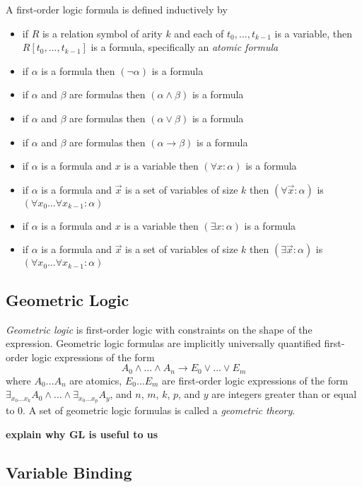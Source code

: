 		A first-order logic formula is defined inductively by
		\begin{itemize}
		\item if $R$ is a relation symbol of arity $k$ and each of $t_0 , \ldots , t_{k-1}$ is a variable, then $R[t_0,\ldots,t_{k-1}]$ is a formula, specifically an \emph{atomic formula}
		\item if $\alpha$ is a formula then $(\neg\alpha)$ is a formula
		\item if $\alpha$ and $\beta$ are formulas then $(\alpha\wedge\beta)$ is a formula
		\item if $\alpha$ and $\beta$ are formulas then $(\alpha\vee\beta)$ is a formula
		\item if $\alpha$ and $\beta$ are formulas then $(\alpha\to\beta)$ is a formula
		\item if $\alpha$ is a formula and $x$ is a variable then $(\forall x : \alpha)$ is a formula
		\item if $\alpha$ is a formula and $\vec{x}$ is a set of variables of size $k$ then $(\forall \vec{x} : \alpha)$ is $(\forall x_0 \ldots \forall x_{k-1} : \alpha)$
		\item if $\alpha$ is a formula and $x$ is a variable then $(\exists x : \alpha)$ is a formula
		\item if $\alpha$ is a formula and $\vec{x}$ is a set of variables of size $k$ then $(\exists \vec{x} : \alpha)$ is $(\forall x_0 \ldots \forall x_{k-1} : \alpha)$
		\end{itemize}

	\subsection{Geometric Logic}

		\emph{Geometric logic} is first-order logic with constraints on the
		shape of the expression.  Geometric logic formulas are implicitly
		universally quantified first-order logic expressions of the form \[A_0
		\wedge \ldots \wedge A_n \to E_0 \vee \ldots \vee E_m\] where $A_0
		\ldots A_n$ are atomics, $E_0 \ldots E_m$ are first-order logic
		expressions of the form $\exists_{x_0 \ldots x_k} A_0 \wedge \ldots
		\wedge \exists_{x_0 \ldots x_p} A_y$, and $n$, $m$, $k$, $p$, and $y$
		are integers greater than or equal to $0$. A set of geometric logic
		formulas is called a \emph{geometric theory}.

		\textbf{explain why GL is useful to us}

	\subsection{Variable Binding}

